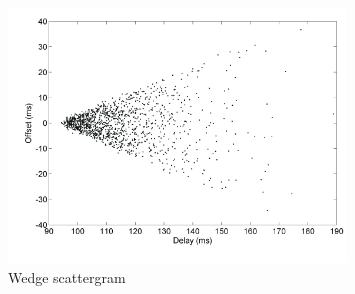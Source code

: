
\begin{figure}[htb]
    \centering
    \includegraphics[width=0.8\textwidth]{figures/clock_filter.png}
    \caption{Wedge scattergram}
    \label{fig:clock_filter}
\end{figure}

